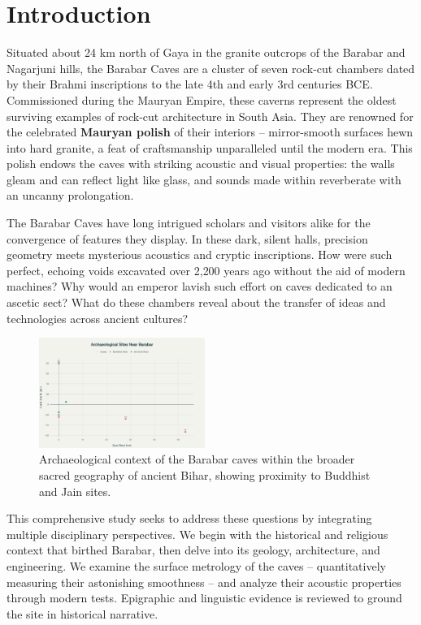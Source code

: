 \documentclass[11pt]{article}
\begin{document}
\section{Introduction}

Situated about 24 km north of Gaya in the granite outcrops of the Barabar and Nagarjuni hills, the Barabar Caves are a cluster of seven rock-cut chambers dated by their Brahmi inscriptions to the late 4th and early 3rd centuries BCE. Commissioned during the Mauryan Empire, these caverns represent the oldest surviving examples of rock-cut architecture in South Asia. They are renowned for the celebrated \textbf{Mauryan polish} of their interiors -- mirror-smooth surfaces hewn into hard granite, a feat of craftsmanship unparalleled until the modern era. This polish endows the caves with striking acoustic and visual properties: the walls gleam and can reflect light like glass, and sounds made within reverberate with an uncanny prolongation.

The Barabar Caves have long intrigued scholars and visitors alike for the convergence of features they display. In these dark, silent halls, precision geometry meets mysterious acoustics and cryptic inscriptions. How were such perfect, echoing voids excavated over 2,200 years ago without the aid of modern machines? Why would an emperor lavish such effort on caves dedicated to an ascetic sect? What do these chambers reveal about the transfer of ideas and technologies across ancient cultures?

\begin{figure}
\centering
\includegraphics[width=0.48\textwidth]{archaeological_sites_map.png}
\caption{Archaeological context of the Barabar caves within the broader sacred geography of ancient Bihar, showing proximity to Buddhist and Jain sites.}
\label{fig:sitemap}
\end{figure}

This comprehensive study seeks to address these questions by integrating multiple disciplinary perspectives. We begin with the historical and religious context that birthed Barabar, then delve into its geology, architecture, and engineering. We examine the surface metrology of the caves -- quantitatively measuring their astonishing smoothness -- and analyze their acoustic properties through modern tests. Epigraphic and linguistic evidence is reviewed to ground the site in historical narrative.
\end{document}
